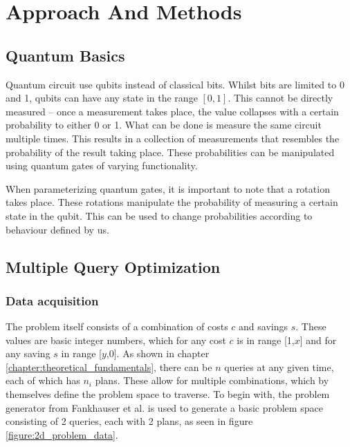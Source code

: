 \chapter{Approach And Methods} %

\label{chapter:approach_and_methods} %


\section{Quantum Basics}
Quantum circuit use qubits instead of classical bits\cite{}. Whilst bits are limited to 0 and 1, qubits can have any state in the range $[0,1]$\cite{}. This cannot be directly measured – once a measurement takes place, the value collapses with a certain probability to either 0 or 1. What can be done is measure the same circuit multiple times. This results in a collection of measurements that resembles the probability of the result taking place. These probabilities can be manipulated using quantum gates of varying functionality.

When parameterizing quantum gates, it is important to note that a rotation takes place. These rotations manipulate the probability of measuring a certain state in the qubit. This can be used to change probabilities according to behaviour defined by us.


\section{Multiple Query Optimization}

\subsection{Data acquisition}
\label{chapter:mqp_data_acquisition}

The problem itself consists of a combination of costs $c$ and savings $s$. These values are basic integer numbers, which for any cost $c$ is in range [1,$x$] and for any saving $s$ in range [$y$,0]. As shown in chapter \ref{chapter:theoretical_fundamentals}, there can be $n$ queries at any given time, each of which has $n_i$ plans. These allow for multiple combinations, which by themselves define the problem space to traverse. To begin with, the problem generator from Fankhauser et al.\cite{fankhauser_multiple_2021} is used to generate a basic problem space consisting of 2 queries, each with 2 plans, as seen in figure \ref{figure:2d_problem_data}.

